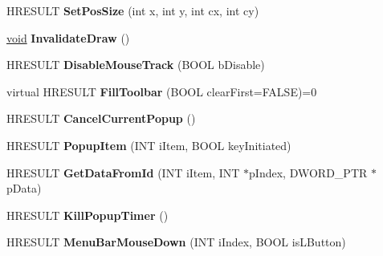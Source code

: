 \begin{DoxyCompactItemize}
\mbox{\label{class_c_menu_toolbar_base_ab24231e3123738991d8507ca4f6910d9}} 
H\+R\+E\+S\+U\+LT {\bfseries Set\+Pos\+Size} (int x, int y, int cx, int cy)
\item 
\mbox{\label{class_c_menu_toolbar_base_aa326e157fd7b3d755fc0a7d305048bde}} 
\hyperlink{interfacevoid}{void} {\bfseries Invalidate\+Draw} ()
\item 
\mbox{\label{class_c_menu_toolbar_base_a72fd2e91f7d6f8ff40f77b0b98098e7b}} 
H\+R\+E\+S\+U\+LT {\bfseries Disable\+Mouse\+Track} (B\+O\+OL b\+Disable)
\item 
\mbox{\label{class_c_menu_toolbar_base_ab8b14b60e24d54076b5be09bfb0e81ee}} 
virtual H\+R\+E\+S\+U\+LT {\bfseries Fill\+Toolbar} (B\+O\+OL clear\+First=F\+A\+L\+SE)=0
\item 
\mbox{\label{class_c_menu_toolbar_base_a4de890bfe193f6864c523f87f9158943}} 
H\+R\+E\+S\+U\+LT {\bfseries Cancel\+Current\+Popup} ()
\item 
\mbox{\label{class_c_menu_toolbar_base_a2030d1624c2fc6b28c0301c1a5511b86}} 
H\+R\+E\+S\+U\+LT {\bfseries Popup\+Item} (I\+NT i\+Item, B\+O\+OL key\+Initiated)
\item 
\mbox{\label{class_c_menu_toolbar_base_ab23b30a5446139469a7517385585a80a}} 
H\+R\+E\+S\+U\+LT {\bfseries Get\+Data\+From\+Id} (I\+NT i\+Item, I\+NT $\ast$p\+Index, D\+W\+O\+R\+D\+\_\+\+P\+TR $\ast$p\+Data)
\item 
\mbox{\label{class_c_menu_toolbar_base_a2752f14c6ba7ac017529ad769772f7c2}} 
H\+R\+E\+S\+U\+LT {\bfseries Kill\+Popup\+Timer} ()
\item 
\mbox{\label{class_c_menu_toolbar_base_aae15027e2aa142944cda78f84ff6cc81}} 
H\+R\+E\+S\+U\+LT {\bfseries Menu\+Bar\+Mouse\+Down} (I\+NT i\+Index, B\+O\+OL is\+L\+Button)
\item 
\mbox{\label{class_c_menu_toolbar_base_a933a0775ff055dda17d9614900a73a67}} 

\end{DoxyCompactItemize}
